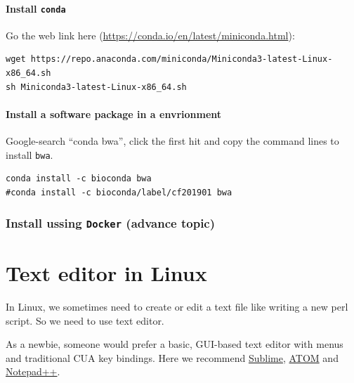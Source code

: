 \documentclass[]{book}
\begin{document}
\hypertarget{install-conda}{%
\subsubsection{\texorpdfstring{Install \texttt{conda}}{Install conda}}\label{install-conda}}

Go the web link here (\url{https://conda.io/en/latest/miniconda.html}):

\begin{verbatim}
wget https://repo.anaconda.com/miniconda/Miniconda3-latest-Linux-x86_64.sh
sh Miniconda3-latest-Linux-x86_64.sh
\end{verbatim}

\hypertarget{install-a-software-package-in-a-envrionment}{%
\subsubsection{Install a software package in a envrionment}\label{install-a-software-package-in-a-envrionment}}

Google-search ``conda bwa'', click the first hit and copy the command lines to install \texttt{bwa}.

\begin{verbatim}
conda install -c bioconda bwa 
#conda install -c bioconda/label/cf201901 bwa 
\end{verbatim}

\hypertarget{install-ussing-docker-advance-topic}{%
\subsection{\texorpdfstring{Install ussing \texttt{Docker} (advance topic)}{Install ussing Docker (advance topic)}}\label{install-ussing-docker-advance-topic}}

\hypertarget{text-editor-in-linux}{%
\chapter{Text editor in Linux}\label{text-editor-in-linux}}

In Linux, we sometimes need to create or edit a text file like writing a new perl script. So we need to use text editor.

As a newbie, someone would prefer a basic, GUI-based text editor with menus and traditional CUA key bindings. Here we recommend \href{https://www.sublimetext.com/}{Sublime}, \href{https://atom.io}{ATOM} and \href{https://notepad-plus-plus.org/}{Notepad++}.
\end{document}
